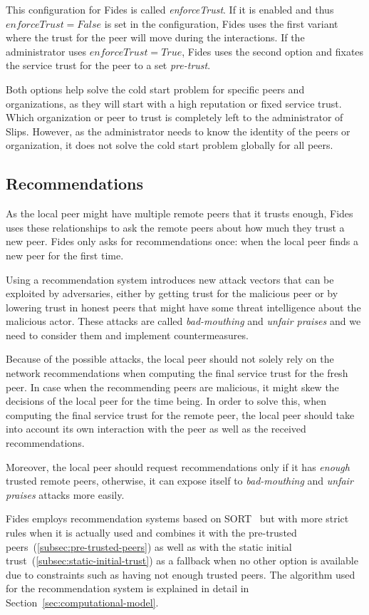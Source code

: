 This configuration for Fides is called \textit{enforceTrust}. If it is enabled and thus $enforceTrust = False$ is set in the configuration, Fides uses the first variant where the trust for the peer will move during the interactions. If the administrator uses $enforceTrust = True$, Fides uses the second option and fixates the service trust for the peer to a set \textit{pre-trust}.

Both options help solve the cold start problem for specific peers and organizations, as they will start with a high reputation or fixed service trust. Which organization or peer to trust is completely left to the administrator of Slips. However, as the administrator needs to know the identity of the peers or organization, it does not solve the cold start problem globally for all peers.

\subsection{Recommendations}
\label{subsec:recommendations}
As the local peer might have multiple remote peers that it trusts enough, Fides uses these relationships to ask the remote peers about how much they trust a new peer. Fides only asks for recommendations once: when the local peer finds a new peer for the first time.  

Using a recommendation system introduces new attack vectors that can be exploited by adversaries, either by getting trust for the malicious peer or by lowering trust in honest peers that might have some threat intelligence about the malicious actor. 
These attacks are called \textit{bad-mouthing} and \textit{unfair praises} and we need to consider them and implement countermeasures.

Because of the possible attacks, the local peer should not solely rely on the network recommendations when computing the final service trust for the fresh peer. In case when the recommending peers are malicious, it might skew the decisions of the local peer for the time being.
In order to solve this, when computing the final service trust for the remote peer, the local peer should take into account its own interaction with the peer as well as the received recommendations.

Moreover, the local peer should request recommendations only if it has \textit{enough} trusted remote peers, otherwise, it can expose itself to \textit{bad-mouthing} and \textit{unfair praises} attacks more easily.

\vspace{7mm}

Fides employs recommendation systems based on SORT~\cite{sort} but with more strict rules when it is actually used and combines it with the pre-trusted peers~(\ref{subsec:pre-trusted-peers}) as well as with the static initial trust~(\ref{subsec:static-initial-trust}) as a fallback when no other option is available due to constraints such as having not enough trusted peers.
The algorithm used for the recommendation system is explained in detail in Section~\ref{sec:computational-model}.